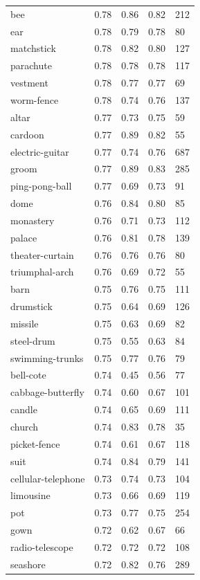 \begin{center}
\begin{longtable}{lllll}
bee & 0.78 & 0.86 & 0.82 & 212 \\
ear & 0.78 & 0.79 & 0.78 & 80 \\
matchstick & 0.78 & 0.82 & 0.80 & 127 \\
parachute & 0.78 & 0.78 & 0.78 & 117 \\
vestment & 0.78 & 0.77 & 0.77 & 69 \\
worm-fence & 0.78 & 0.74 & 0.76 & 137 \\
altar & 0.77 & 0.73 & 0.75 & 59 \\
cardoon & 0.77 & 0.89 & 0.82 & 55 \\
electric-guitar & 0.77 & 0.74 & 0.76 & 687 \\
groom & 0.77 & 0.89 & 0.83 & 285 \\
ping-pong-ball & 0.77 & 0.69 & 0.73 & 91 \\
dome & 0.76 & 0.84 & 0.80 & 85 \\
monastery & 0.76 & 0.71 & 0.73 & 112 \\
palace & 0.76 & 0.81 & 0.78 & 139 \\
theater-curtain & 0.76 & 0.76 & 0.76 & 80 \\
triumphal-arch & 0.76 & 0.69 & 0.72 & 55 \\
barn & 0.75 & 0.76 & 0.75 & 111 \\
drumstick & 0.75 & 0.64 & 0.69 & 126 \\
missile & 0.75 & 0.63 & 0.69 & 82 \\
steel-drum & 0.75 & 0.55 & 0.63 & 84 \\
swimming-trunks & 0.75 & 0.77 & 0.76 & 79 \\
bell-cote & 0.74 & 0.45 & 0.56 & 77 \\
cabbage-butterfly & 0.74 & 0.60 & 0.67 & 101 \\
candle & 0.74 & 0.65 & 0.69 & 111 \\
church & 0.74 & 0.83 & 0.78 & 35 \\
picket-fence & 0.74 & 0.61 & 0.67 & 118 \\
suit & 0.74 & 0.84 & 0.79 & 141 \\
cellular-telephone & 0.73 & 0.74 & 0.73 & 104 \\
limousine & 0.73 & 0.66 & 0.69 & 119 \\
pot & 0.73 & 0.77 & 0.75 & 254 \\
gown & 0.72 & 0.62 & 0.67 & 66 \\
radio-telescope & 0.72 & 0.72 & 0.72 & 108 \\
seashore & 0.72 & 0.82 & 0.76 & 289 \\

\end{longtable}
\end{center}
